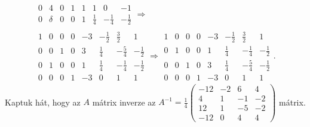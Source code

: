 \documentclass[a4paper, showtrims]{memoir}
\theoremstyle{plain}
\theoremstyle{remark}
\theoremstyle{definition}
\begin{document}
\begin{multline*}
\begin{array}{cccc|cccc}
		0 & 4          & 0 & 1 & 1  & 1           & 0            & -1           \\
		\hline
		0 & \delta     & 0 & 0 & 1  & \frac{1}{4} & -\frac{1}{4} & -\frac{1}{2}
	\end{array}\Longrightarrow
	\\
	\begin{array}{cccc|cccc}
		1 & 0 & 0 & 0 & -3 & -\frac{1}{2} & \frac{3}{2}  & 1            \\
		0 & 0 & 1 & 0 & 3  & \frac{1}{4}  & -\frac{5}{4} & -\frac{1}{2} \\
		0 & 1 & 0 & 0 & 1  & \frac{1}{4}  & -\frac{1}{4} & -\frac{1}{2} \\
		0 & 0 & 0 & 1 & -3 & 0            & 1            & 1
	\end{array}\Longrightarrow
	\begin{array}{cccc|cccc}
		1 & 0 & 0 & 0 & -3 & -\frac{1}{2} & \frac{3}{2}  & 1            \\
		0 & 1 & 0 & 0 & 1  & \frac{1}{4}  & -\frac{1}{4} & -\frac{1}{2} \\
		0 & 0 & 1 & 0 & 3  & \frac{1}{4}  & -\frac{5}{4} & -\frac{1}{2} \\
		0 & 0 & 0 & 1 & -3 & 0            & 1            & 1
	\end{array}.
\end{multline*}
Kaptuk hát, hogy az $A$ mátrix inverze az
\begin{math}
	A^{-1}=\frac{1}{4}
	\begin{pmatrix}
		-12 & -2 & 6  & 4  \\
		4   & 1  & -1 & -2 \\
		12  & 1  & -5 & -2 \\
		-12 & 0  & 4  & 4
	\end{pmatrix}
\end{math}
mátrix.
\end{document}
